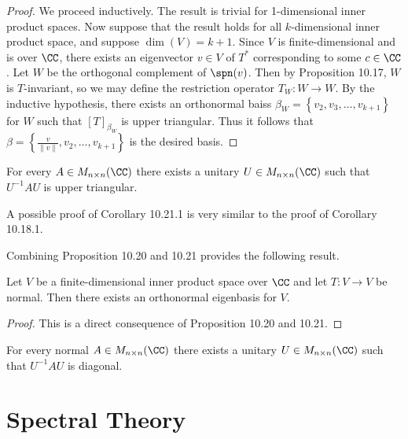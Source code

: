 \documentclass[linearalgebra]{subfiles}
\begin{document}
    \begin{proof}
        We proceed inductively. The result is trivial for 1-dimensional inner product spaces. Now suppose that the result holds for all $k$-dimensional inner product space, and suppose $\dim\left( V \right) = k+1$. Since $V$ is finite-dimensional and is over $\CC$, there exists an eigenvector $v\in V$ of $T^*$ corresponding to some $c\in\CC$. Let $W$ be the orthogonal complement of $\spn(v)$. Then by Proposition 10.17, $W$ is $T$-invariant, so we may define the restriction operator $T_W:W\to W$. By the inductive hypothesis, there exists an orthonormal baiss $\beta_W = \left\lbrace v_2,v_3,\ldots,v_{k+1} \right\rbrace$ for $W$ such that $\left[ T \right] _{\beta_W}$ is upper triangular. Thus it follows that $\beta = \left\lbrace \frac{v}{\left\lVert v\right\rVert }, v_2, \ldots, v_{k+1} \right\rbrace$ is the desired basis.
    \end{proof}

    \begin{cor}{}
        For every $A\in M_{n\times n}(\CC)$ there exists a unitary $U\in M_{n\times n}(\CC)$ such that $U^{-1}AU$ is upper triangular.
    \end{cor}	

    \begin{remark}
        A possible proof of Corollary 10.21.1 is very similar to the proof of Corollary 10.18.1.
    \end{remark}

    \begin{remark}
        Combining Proposition 10.20 and 10.21 provides the following result.
    \end{remark}

    \begin{theorem}{}
        Let $V$ be a finite-dimensional inner product space over $\CC$ and let $T:V\to V$ be normal. Then there exists an orthonormal eigenbasis for $V$.
    \end{theorem}

    \begin{proof}
        This is a direct consequence of Proposition 10.20 and 10.21.
    \end{proof}

    \begin{cor}{}
        For every normal $A\in M_{n\times n}(\CC)$ there exists a unitary $U\in M_{n\times n}(\CC)$ such that $U^{-1}AU$ is diagonal.
    \end{cor}	

    \section{Spectral Theory}
    
\end{document}
